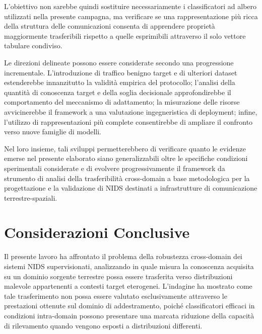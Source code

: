 L'obiettivo non sarebbe quindi sostituire necessariamente i classificatori ad albero utilizzati nella presente campagna, ma verificare se una rappresentazione più ricca della struttura delle comunicazioni consenta di apprendere proprietà maggiormente trasferibili rispetto a quelle esprimibili attraverso il solo vettore tabulare condiviso.

Le direzioni delineate possono essere considerate secondo una progressione incrementale.
L'introduzione di traffico benigno target e di ulteriori dataset estenderebbe innanzitutto la validità empirica del protocollo; l'analisi della quantità di conoscenza target e della soglia decisionale approfondirebbe il comportamento del meccanismo di adattamento; la misurazione delle risorse avvicinerebbe il framework a una valutazione ingegneristica di deployment; infine, l'utilizzo di rappresentazioni più complete consentirebbe di ampliare il confronto verso nuove famiglie di modelli.

Nel loro insieme, tali sviluppi permetterebbero di verificare quanto le evidenze emerse nel presente elaborato siano generalizzabili oltre le specifiche condizioni sperimentali considerate e di evolvere progressivamente il framework da strumento di analisi della trasferibilità cross-domain a base metodologica per la progettazione e la validazione di NIDS destinati a infrastrutture di comunicazione terrestre-spaziali.




\section{Considerazioni Conclusive}
\label{sec:considerazioni_conclusive}

Il presente lavoro ha affrontato il problema della robustezza cross-domain dei sistemi NIDS supervisionati, analizzando in quale misura la conoscenza acquisita su un dominio sorgente terrestre possa essere trasferita verso distribuzioni malevole appartenenti a contesti target eterogenei.
L'indagine ha mostrato come tale trasferimento non possa essere valutato esclusivamente attraverso le prestazioni ottenute sul dominio di addestramento, poiché classificatori efficaci in condizioni intra-domain possono presentare una marcata riduzione della capacità di rilevamento quando vengono esposti a distribuzioni differenti.

